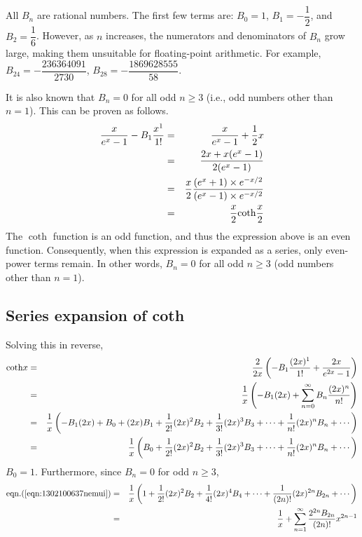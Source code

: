 \documentclass[uplatex,a4j,12pt,dvipdfmx]{jsarticle}
\begin{document}
All $B_{n}$ are rational numbers. The first few terms are:
$B_{0}=1$, $B_{1}=-\dfrac{1}{2}$, and $B_{2}=\dfrac{1}{6}$.
However, as $n$ increases, the numerators and denominators of $B_{n}$ grow large, making them unsuitable for floating-point arithmetic.
For example,
$B_{24}=-\dfrac{236364091}{2730}$,
$B_{28}=-\dfrac{1869628555}{58}$.

It is also known that $B_{n}=0$ for all odd $n \geq 3$ (i.e., odd numbers other than $n=1$).
This can be proven as follows.
\begin{eqnarray}
	\dfrac{x}{e^{x}-1}
	-
	B_{1}
	\dfrac{x^{1}}{1!}
	&=&
	\dfrac{x}{e^{x}-1}
	+
	\dfrac{1}{2}x
	\nonumber \\ &=&
	\dfrac{2x + x(e^{x} -1)}{2(e^{x}-1)}
	\nonumber \\ &=&
	\dfrac{x}{2}
	\dfrac{(e^{x} +1) \times e^{-x/2}}{(e^{x}-1)\times e^{-x/2}}
	\nonumber \\ &=&
	\dfrac{x}{2}
	{\rm coth}\dfrac{x}{2}
\end{eqnarray}
The $\coth$ function is an odd function, and thus the expression above is an even function.
Consequently, when this expression is expanded as a series, only even-power terms remain.
In other words,
$B_{n}=0$ for all odd $n \geq 3$ (odd numbers other than $n=1$).

\subsection{Series expansion of coth}

Solving this in reverse,
\begin{eqnarray}
	{\rm coth}x
	&=&
	\dfrac{2}{2x}
	\left(
	-
	B_{1}
	\dfrac{(2x)^{1}}{1!}
	+
	\dfrac{2x}{e^{2x}-1}
	\right)
	\nonumber \\ &=&
	\dfrac{1}{x}
	\left(
	-B_{1}(2x)
	+
	\sum_{n=0}^{\infty}
	B_{n}
	\dfrac{(2x)^{n}}{n!}
	\right)
	\nonumber \\ &=&
	\dfrac{1}{x}
	\left(
	-B_{1}(2x)
	+
	B_{0}
	+
	(2x)
	B_{1}
	+
	\dfrac{1}{2!}
	(2x)^{2}
	B_{2}
	+
	\dfrac{1}{3!}
	(2x)^{3}
	B_{3}
	+
	\cdots
	+
	\dfrac{1}{n!}
	(2x)^{n}
	B_{n}
	+
	\cdots
	\right)
	\nonumber \\ &=&
	\dfrac{1}{x}
	\left(
	B_{0}
	+
	\dfrac{1}{2!}
	(2x)^{2}
	B_{2}
	+
	\dfrac{1}{3!}
	(2x)^{3}
	B_{3}
	+
	\cdots
	+
	\dfrac{1}{n!}
	(2x)^{n}
	B_{n}
	+
	\cdots
	\right)
	\label{eqn:1302100637nemui}
\end{eqnarray}
$B_{0}=1$. Furthermore, since $B_{n}=0$ for odd $n \geq 3$,
\begin{eqnarray}
	{\rm eqn.}(\ref{eqn:1302100637nemui})
	&=&
	\dfrac{1}{x}
	\left(
	1
	+
	\dfrac{1}{2!}
	(2x)^{2}
	B_{2}
	+
	\dfrac{1}{4!}
	(2x)^{4}
	B_{4}
	+
	\cdots
	+
	\dfrac{1}{(2n)!}
	(2x)^{2n}
	B_{2n}
	+
	\cdots
	\right)
	\nonumber \\ &=&
	\dfrac{1}{x}
	+
	\sum_{n=1}^{\infty}
	\dfrac{
		2^{2n}
		B_{2n}
	}{(2n)!}
	x^{2n-1}
\end{eqnarray}
\end{document}
